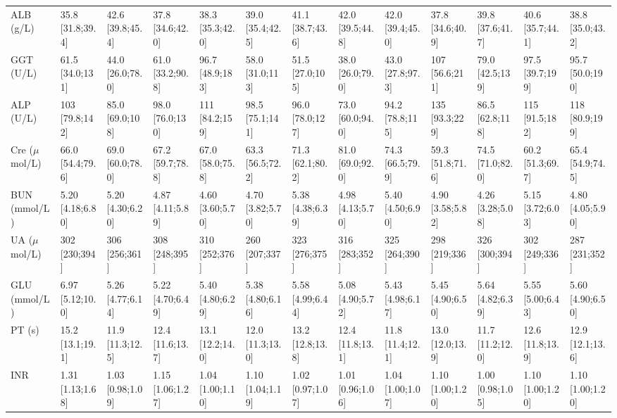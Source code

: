 \documentclass{article}
\begin{document}
\begin{landscape}
\begin{tiny}
\begin{tabularx}{\linewidth}{p{4.5cm}|X|X|X|X|X|X|X|X|X|X|X|X}
\rowcolor{gray!10}
ALB (g/L) & 35.8 [31.8;39.4] & 42.6 [39.8;45.4] & 37.8 [34.6;42.0] & 38.3 [35.3;42.0] & 39.0 [35.4;42.5] & 41.1 [38.7;43.6] & 42.0 [39.5;44.8] & 42.0 [39.4;45.0] & 37.8 [34.6;40.9] & 39.8 [37.6;41.7] & 40.6 [35.7;44.1] & 38.8 [35.0;43.2] \\
\rowcolor{gray!10}
GGT (U/L) & 61.5 [34.0;131]  & 44.0 [26.0;78.0] & 61.0 [33.2;90.8] & 96.7 [48.9;183]  & 58.0 [31.0;113]  & 51.5 [27.0;105]  & 38.0 [26.0;79.0] & 43.0 [27.8;97.3] &  107 [56.6;211]  & 79.0 [42.5;139]  & 97.5 [39.7;199]  & 95.7 [50.0;190]  \\
\rowcolor{gray!10}
ALP (U/L) &  103 [79.8;142]  & 85.0 [69.0;108]  & 98.0 [76.0;130]  &  111 [84.2;159]  & 98.5 [75.1;141]  & 96.0 [78.0;127]  & 73.0 [60.0;94.0] & 94.2 [78.8;115]  &  135 [93.3;229]  & 86.5 [62.8;118]  &  115 [91.5;182]  &  118 [80.9;199]  \\
\rowcolor{gray!10}
Cre ($\mu$mol/L) & 66.0 [54.4;79.6] & 69.0 [60.0;78.0] & 67.2 [59.7;78.8] & 67.0 [58.0;75.8] & 63.3 [56.5;72.2] & 71.3 [62.1;80.2] & 81.0 [69.0;92.0] & 74.3 [66.5;79.9] & 59.3 [51.8;71.6] & 74.5 [71.0;82.0] & 60.2 [51.3;69.7] & 65.4 [54.9;74.5] \\
\rowcolor{gray!10}
BUN (mmol/L) & 5.20 [4.18;6.80] & 5.20 [4.30;6.20] & 4.87 [4.11;5.89] & 4.60 [3.60;5.70] & 4.70 [3.82;5.70] & 5.38 [4.38;6.39] & 4.98 [4.13;5.70] & 5.40 [4.50;6.90] & 4.90 [3.58;5.82] & 4.26 [3.28;5.08] & 5.15 [3.72;6.03] & 4.80 [4.05;5.90] \\
\rowcolor{gray!10}
UA ($\mu$mol/L) &  302 [230;394]   &  306 [256;361]   &  308 [248;395]   &  310 [252;376]   &  260 [207;337]   &  323 [276;375]   &  316 [283;352]   &  325 [264;390]   &  298 [219;336]   &  326 [300;394]   &  302 [249;336]   &  287 [231;352]   \\
\rowcolor{gray!10}
GLU (mmol/L) & 6.97 [5.12;10.0] & 5.26 [4.77;6.14] & 5.22 [4.70;6.49] & 5.40 [4.80;6.29] & 5.38 [4.80;6.16] & 5.58 [4.99;6.44] & 5.08 [4.90;5.72] & 5.43 [4.98;6.17] & 5.45 [4.90;6.50] & 5.64 [4.82;6.39] & 5.55 [5.00;6.43] & 5.60 [4.90;6.50] \\
\rowcolor{gray!10}
PT (s) & 15.2 [13.1;19.1] & 11.9 [11.3;12.5] & 12.4 [11.6;13.7] & 13.1 [12.2;14.0] & 12.0 [11.3;13.0] & 13.2 [12.8;13.8] & 12.4 [11.8;13.1] & 11.8 [11.4;12.1] & 13.0 [12.0;13.9] & 11.7 [11.2;12.0] & 12.6 [11.8;13.9] & 12.9 [12.1;13.6] \\
\rowcolor{gray!10}
INR & 1.31 [1.13;1.68] & 1.03 [0.98;1.09] & 1.15 [1.06;1.27] & 1.04 [1.00;1.10] & 1.10 [1.04;1.19] & 1.02 [0.97;1.07] & 1.01 [0.96;1.06] & 1.04 [1.00;1.07] & 1.10 [1.00;1.20] & 1.00 [0.98;1.05] & 1.10 [1.00;1.20] & 1.10 [1.00;1.20] \\

\end{tabularx}
\end{tiny}
\end{landscape}
\end{document}
